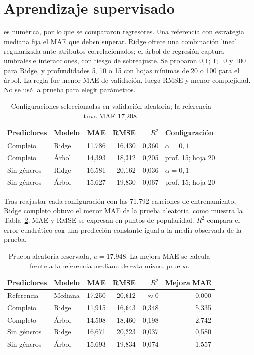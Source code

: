 \section{Aprendizaje supervisado}

 es numérica, por lo que se compararon regresores. Una referencia
 con estrategia mediana fija el MAE que deben superar. Ridge
ofrece una combinación lineal regularizada ante atributos correlacionados; el árbol
de regresión captura umbrales e interacciones, con riesgo de sobreajuste. Se probaron
 0,1; 1; 10 y 100 para Ridge, y profundidades 5, 10 o 15 con hojas
mínimas de 20 o 100 para el árbol. La regla fue menor MAE de validación, luego RMSE
y menor complejidad. No se usó la prueba para elegir parámetros.

\begin{table}[htbp]
\centering\small
\begin{tabular}{llrrrl}
\toprule
Predictores & Modelo & MAE & RMSE & $R^2$ & Configuración \\
\midrule
Completo & Ridge & 11,786 & 16,430 & 0,360 & $\alpha=0,1$ \\
Completo & Árbol & 14,393 & 18,312 & 0,205 & prof. 15; hoja 20 \\
Sin géneros & Ridge & 16,581 & 20,162 & 0,036 & $\alpha=0,1$ \\
Sin géneros & Árbol & 15,627 & 19,830 & 0,067 & prof. 15; hoja 20 \\
\bottomrule
\end{tabular}
\caption{Configuraciones seleccionadas en validación aleatoria; la referencia tuvo MAE 17,208.}
\label{tab:validation}
\end{table}

Tras reajustar cada configuración con las 71.792 canciones de entrenamiento, Ridge
completo obtuvo el menor MAE de la prueba aleatoria, como muestra la
Tabla~\ref{tab:random-test}. MAE y RMSE se expresan en puntos de popularidad.
$R^2$ compara el error cuadrático con una predicción constante igual a la media
observada de la prueba.

\begin{table}[htbp]
\centering\small
\begin{tabular}{llrrrr}
\toprule
Predictores & Modelo & MAE & RMSE & $R^2$ & Mejora MAE \\
\midrule
Referencia & Mediana & 17,250 & 20,612 & $\approx 0$ & 0,000 \\
Completo & Ridge & 11,915 & 16,643 & 0,348 & 5,335 \\
Completo & Árbol & 14,508 & 18,460 & 0,198 & 2,742 \\
Sin géneros & Ridge & 16,671 & 20,223 & 0,037 & 0,580 \\
Sin géneros & Árbol & 15,693 & 19,834 & 0,074 & 1,557 \\
\bottomrule
\end{tabular}
\caption{Prueba aleatoria reservada, $n=17.948$. La mejora MAE se calcula frente a la referencia mediana de esta misma prueba.}
\label{tab:random-test}
\end{table}

